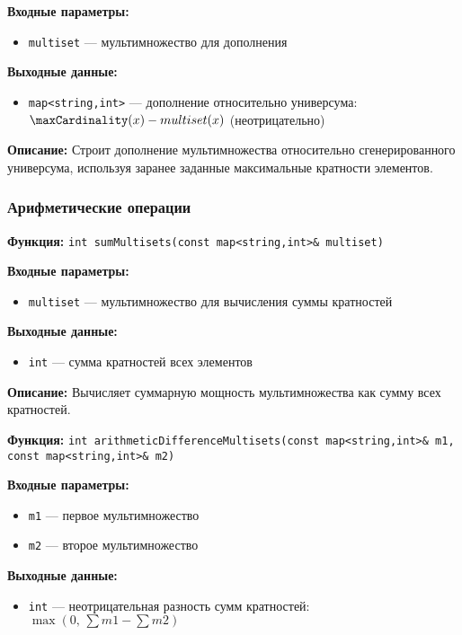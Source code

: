 \documentclass[12pt,a4paper]{article}
\begin{document}
\textbf{Входные параметры:}
\begin{itemize}
    \item \texttt{multiset} — мультимножество для дополнения
\end{itemize}

\textbf{Выходные данные:}
\begin{itemize}
    \item \texttt{map<string,int>} — дополнение относительно универсума: $\maxCardinality(x)-multiset(x)$ (неотрицательно)
\end{itemize}

\textbf{Описание:} Строит дополнение мультимножества относительно сгенерированного универсума, используя заранее заданные максимальные кратности элементов.

\subsubsection{Арифметические операции}

\textbf{Функция:} \texttt{int sumMultisets(const map<string,int>\& multiset)}

\textbf{Входные параметры:}
\begin{itemize}
    \item \texttt{multiset} — мультимножество для вычисления суммы кратностей
\end{itemize}

\textbf{Выходные данные:}
\begin{itemize}
    \item \texttt{int} — сумма кратностей всех элементов
\end{itemize}

\textbf{Описание:} Вычисляет суммарную мощность мультимножества как сумму всех кратностей.

\vspace{6pt}

\textbf{Функция:} \texttt{int arithmeticDifferenceMultisets(const map<string,int>\& m1, const map<string,int>\& m2)}

\textbf{Входные параметры:}
\begin{itemize}
    \item \texttt{m1} — первое мультимножество
    \item \texttt{m2} — второе мультимножество
\end{itemize}

\textbf{Выходные данные:}
\begin{itemize}
    \item \texttt{int} — неотрицательная разность сумм кратностей: $\max(0,\,\sum m1 - \sum m2)$
\end{itemize}
\end{document}

